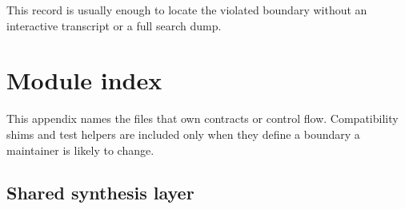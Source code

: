 \documentclass[10pt,letterpaper,oneside]{report}
\begin{document}
This record is usually enough to locate the violated boundary without an interactive transcript or a full search dump.

\appendix

\chapter{Module index}\label{app:module-index}

This appendix names the files that own contracts or control flow. Compatibility shims and test helpers are included only when they define a boundary a maintainer is likely to change.

\section{Shared synthesis layer}
\end{document}
